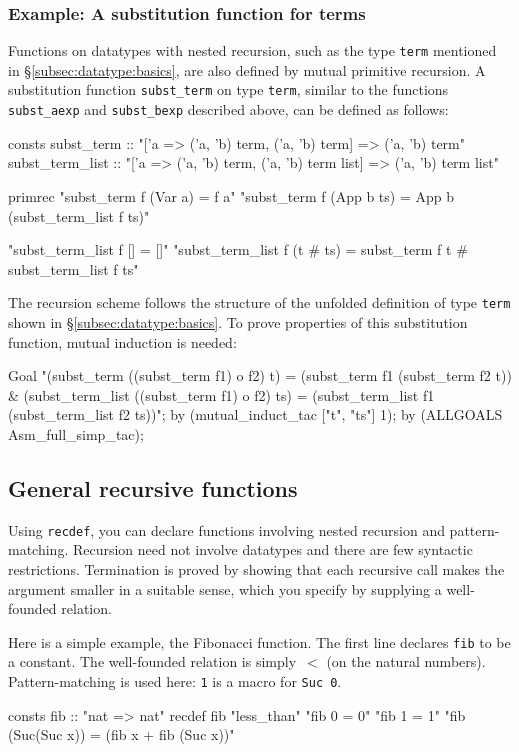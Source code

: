 \subsubsection{Example: A substitution function for terms}
Functions on datatypes with nested recursion, such as the type
\texttt{term} mentioned in \S\ref{subsec:datatype:basics}, are
also defined by mutual primitive recursion. A substitution
function \texttt{subst_term} on type \texttt{term}, similar to the functions
\texttt{subst_aexp} and \texttt{subst_bexp} described above, can
be defined as follows:
\begin{ttbox}
consts
  subst_term :: "['a => ('a, 'b) term, ('a, 'b) term] => ('a, 'b) term"
  subst_term_list ::
    "['a => ('a, 'b) term, ('a, 'b) term list] => ('a, 'b) term list"

primrec
  "subst_term f (Var a) = f a"
  "subst_term f (App b ts) = App b (subst_term_list f ts)"

  "subst_term_list f [] = []"
  "subst_term_list f (t # ts) =
     subst_term f t # subst_term_list f ts"
\end{ttbox}
The recursion scheme follows the structure of the unfolded definition of type
\texttt{term} shown in \S\ref{subsec:datatype:basics}. To prove properties of
this substitution function, mutual induction is needed:
\begin{ttbox}
Goal
  "(subst_term ((subst_term f1) o f2) t) =
     (subst_term f1 (subst_term f2 t)) &
   (subst_term_list ((subst_term f1) o f2) ts) =
     (subst_term_list f1 (subst_term_list f2 ts))";
by (mutual_induct_tac ["t", "ts"] 1);
by (ALLGOALS Asm_full_simp_tac);
\end{ttbox}



\subsection{General recursive functions}
\label{sec:HOL:recdef}

Using \texttt{recdef}, you can declare functions involving nested recursion
and pattern-matching.  Recursion need not involve datatypes and there are few
syntactic restrictions.  Termination is proved by showing that each recursive
call makes the argument smaller in a suitable sense, which you specify by
supplying a well-founded relation.

Here is a simple example, the Fibonacci function.  The first line declares
\texttt{fib} to be a constant.  The well-founded relation is simply~$<$ (on
the natural numbers).  Pattern-matching is used here: \texttt{1} is a
macro for \texttt{Suc~0}.
\begin{ttbox}
consts fib  :: "nat => nat"
recdef fib "less_than"
    "fib 0 = 0"
    "fib 1 = 1"
    "fib (Suc(Suc x)) = (fib x + fib (Suc x))"
\end{ttbox}

